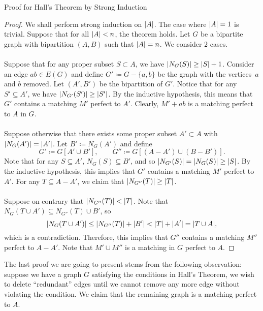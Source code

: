 \documentclass[math, code]{amznotes}
\theoremstyle{remark}
\begin{document}
\begin{genbox}{Proof for Hall's Theorem by Strong Induction}
    \begin{proof}
        We shall perform strong induction on ${\left\lvert {A} \right\rvert}$. The case where ${\left\lvert {A} \right\rvert} = 1$ is trivial. Suppose that for all ${\left\lvert {A} \right\rvert} < n$, the theorem holds. Let $G$ be a bipartite graph with bipartition $(A, B)$ such that ${\left\lvert {A} \right\rvert} = n$. We consider $2$ cases.
        \\\\
        Suppose that for any proper subset $S \subset A$, we have ${\left\lvert {N_G(S)} \right\rvert} \geq {\left\lvert {S} \right\rvert} + 1$. Consider an edge $ab \in E(G)$ and define $G' \coloneqq G - \{a, b\}$ be the graph with the vertices~$a$ and $b$ removed. Let $(A', B')$ be the bipartition of $G'$. Notice that for any $S' \subseteq A'$, we have ${\left\lvert {N_{G'}(S')} \right\rvert} \geq {\left\lvert {S'} \right\rvert}$. By the inductive hypothesis, this means that $G'$ contains a matching $M'$ perfect to $A'$. Clearly, $M' + ab$ is a matching perfect to $A$ in $G$.
        \\\\
        Suppose otherwise that there exists some proper subset $A' \subset A$ with ${\left\lvert {N_G(A')} \right\rvert} = {\left\lvert {A'} \right\rvert}$. Let $B' \coloneqq N_G(A')$ and define
        \begin{equation*}
            G' \coloneqq G[A' \cup B'], \qquad G'' \coloneqq G[(A - A') \cup (B - B')].
        \end{equation*}
        Note that for any $S \subseteq A'$, $N_{G}(S) \subseteq B'$, and so ${\left\lvert {N_{G'}(S)} \right\rvert} = {\left\lvert {N_G(S)} \right\rvert} \geq {\left\lvert {S} \right\rvert}$. By the inductive hypothesis, this implies that $G'$ contains a matching $M'$ perfect to $A'$. For any $T \subseteq A - A'$, we claim that ${\left\lvert {N_{G''}(T)} \right\rvert} \geq {\left\lvert {T} \right\rvert}$.
        \\\\
        Suppose on contrary that ${\left\lvert {N_{G''}(T)} \right\rvert} < {\left\lvert {T} \right\rvert}$. Note that $N_G(T \cup A') \subseteq N_{G''}(T) \cup B'$, so
        \begin{equation*}
            {\left\lvert {N_G(T \cup A')} \right\rvert} \leq {\left\lvert {N_{G''}(T)} \right\rvert} + {\left\lvert {B'} \right\rvert} < {\left\lvert {T} \right\rvert} + {\left\lvert {A'} \right\rvert} = {\left\lvert {T \cup A} \right\rvert},
        \end{equation*}
        which is a contradiction. Therefore, this implies that $G''$ contains a matching $M''$ perfect to $A - A'$. Note that $M' \cup M''$ is a matching in $G$ perfect to $A$.
    \end{proof}
\end{genbox}
The last proof we are going to present stems from the following observation: suppose we have a graph $G$ satisfying the conditions in Hall's Theorem, we wish to delete ``redundant'' edges until we cannot remove any more edge without violating the condition. We claim that the remaining graph is a matching perfect to $A$.
\end{document}

